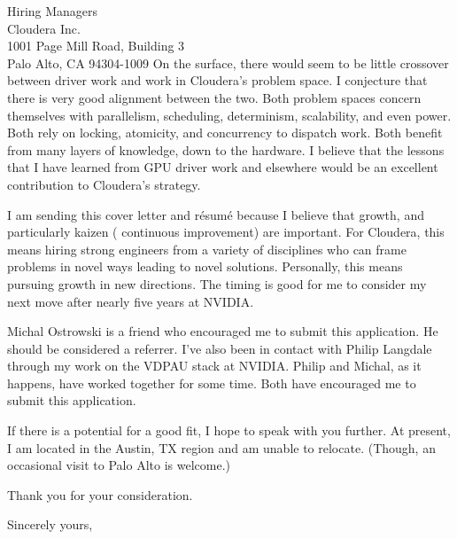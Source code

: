 \documentclass{letter} %
\begin{document}
\begin{letter}{Hiring Managers\\
Cloudera Inc.\\
1001 Page Mill Road, Building 3\\ 
Palo Alto, CA 94304-1009}
On the surface, there would seem to be little crossover between driver work
and work in Cloudera's problem space. I conjecture that there is very good
alignment
between the two. Both problem spaces concern themselves with parallelism,
scheduling, determinism, scalability, and even power. Both rely on locking,
atomicity, and concurrency to dispatch work. Both benefit from many layers
of knowledge, down to the hardware. I believe that the lessons that I have
learned from GPU driver work and elsewhere would be an excellent contribution
to Cloudera's strategy.
 

I am sending this cover letter and r\'esum\'e because I believe that
growth, and particularly kaizen (
continuous improvement) are important. For Cloudera, this means hiring
strong engineers from a variety of disciplines who can frame problems in
novel ways leading to novel solutions. Personally, this means pursuing
growth in new directions. The timing is good for me to consider my next
move after nearly five years at NVIDIA.

Michal Ostrowski is a friend who encouraged me to submit this application.
He should be considered a referrer. I've also been in contact with
Philip Langdale through my work on the VDPAU stack at NVIDIA. Philip and
Michal, as it happens, have worked together for some time. Both have
encouraged me to submit this application.

If there is a potential for a good fit, I hope to speak with you further.
At present, I am located in the Austin, TX region and am unable to relocate.
(Though, an occasional visit to Palo Alto is welcome.)

Thank you for your consideration.
 
\closing{Sincerely yours,} 
 

 

\end{letter}
 
\end{document}
